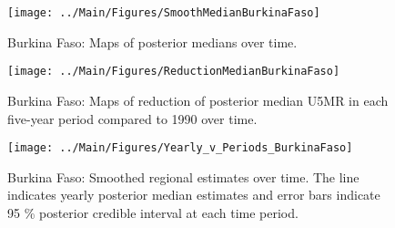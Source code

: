 \documentclass[12pt]{article}\usepackage[]{graphicx}\usepackage[]{color}
\newenvironment{knitrout}{}{} %
\begin{document}
\begin{knitrout}
\color{fgcolor}\begin{figure}[bht]

{\centering \texttt{[image: ../Main/Figures/SmoothMedianBurkinaFaso]} 

}

\caption[Burkina Faso]{Burkina Faso: Maps of posterior medians over time.}\label{fig:unnamed-chunk-24}
\end{figure}


\end{knitrout}
\begin{knitrout}
\color{fgcolor}\begin{figure}[bht]

{\centering \texttt{[image: ../Main/Figures/ReductionMedianBurkinaFaso]} 

}

\caption[Burkina Faso]{Burkina Faso: Maps of reduction of posterior median U5MR in each five-year period compared to 1990 over time.}\label{fig:unnamed-chunk-25}
\end{figure}


\end{knitrout}
\begin{knitrout}
\color{fgcolor}\begin{figure}[bht]

{\centering \texttt{[image: ../Main/Figures/Yearly\_v\_Periods\_BurkinaFaso]} 

}

\caption[Burkina Faso]{Burkina Faso: Smoothed regional estimates over time. The line indicates yearly posterior median estimates and error bars indicate 95 \% posterior credible interval at each time period.}\label{fig:unnamed-chunk-26}
\end{figure}


\end{knitrout}
\end{document}
